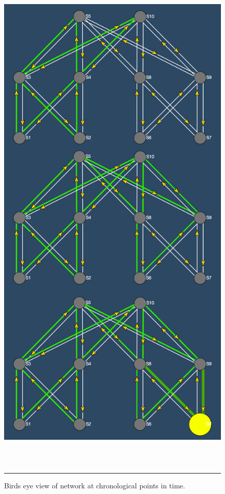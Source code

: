 \begin{figure}[htbp]
	\centering
		\includegraphics[width=20cm,height=25cm,keepaspectratio]{Figures/genview_sync.png}
		\rule{35em}{0.5pt}
	\caption[Birds eye view, Synchronous Incast]{Birds eye view of network at chronological points in time.}
	\label{fig:genview_sync}
\end{figure}

